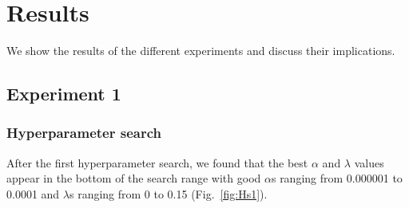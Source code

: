 \chapter{Results}
\label{ch:results}
We show the results of the different experiments and discuss their implications.

\section{Experiment 1}
\subsection{Hyperparameter search}
After the first hyperparameter search, we found that the best $\alpha$ and $\lambda$ values appear in the bottom of the search range with good $\alpha$s ranging from 0.000001 to 0.0001 and $\lambda$s ranging from 0 to 0.15 (Fig.~\ref{fig:Hs1}).
